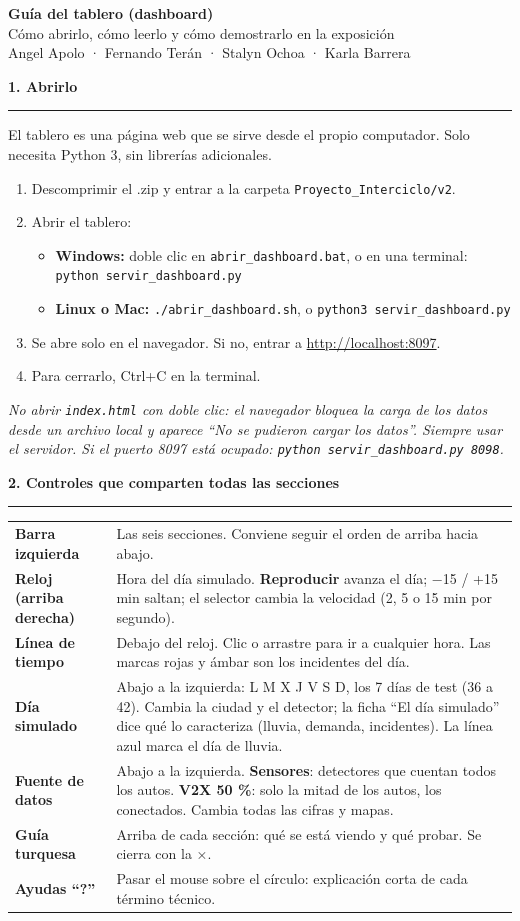 \documentclass[11pt,a4paper]{article}
\newcommand{\seccion}[1]{\bigskip\par{\Large\bfseries\color{verde}#1}\par\smallskip\hrule\smallskip}
\newcommand{\nota}[1]{{\small\color{gris}\itshape #1}\par}
\begin{document}
{\LARGE\bfseries\color{verde} Guía del tablero (dashboard)}\\[4pt]
{\large Cómo abrirlo, cómo leerlo y cómo demostrarlo en la exposición}\\[2pt]
{\color{gris}Angel Apolo · Fernando Terán · Stalyn Ochoa · Karla Barrera}

\seccion{1. Abrirlo}
El tablero es una página web que se sirve desde el propio computador. Solo necesita Python 3, sin librerías adicionales.

\begin{enumerate}[leftmargin=*]
\item Descomprimir el .zip y entrar a la carpeta \texttt{Proyecto\_Interciclo/v2}.
\item Abrir el tablero:
  \begin{itemize}
  \item \textbf{Windows:} doble clic en \texttt{abrir\_dashboard.bat}, o en una terminal: \texttt{python servir\_dashboard.py}
  \item \textbf{Linux o Mac:} \texttt{./abrir\_dashboard.sh}, o \texttt{python3 servir\_dashboard.py}
  \end{itemize}
\item Se abre solo en el navegador. Si no, entrar a \url{http://localhost:8097}.
\item Para cerrarlo, Ctrl+C en la terminal.
\end{enumerate}
\nota{No abrir \texttt{index.html} con doble clic: el navegador bloquea la carga de los datos desde un archivo local y aparece ``No se pudieron cargar los datos''. Siempre usar el servidor. Si el puerto 8097 está ocupado: \texttt{python servir\_dashboard.py 8098}.}

\seccion{2. Controles que comparten todas las secciones}
\begin{tabular}{@{}>{\bfseries}p{3.6cm}p{12.6cm}@{}}
Barra izquierda & Las seis secciones. Conviene seguir el orden de arriba hacia abajo. \\[3pt]
Reloj (arriba derecha) & Hora del día simulado. \textbf{Reproducir} avanza el día; −15 / +15 min saltan; el selector cambia la velocidad (2, 5 o 15 min por segundo). \\[3pt]
Línea de tiempo & Debajo del reloj. Clic o arrastre para ir a cualquier hora. Las marcas rojas y ámbar son los incidentes del día. \\[3pt]
Día simulado & Abajo a la izquierda: L M X J V S D, los 7 días de test (36 a 42). Cambia la ciudad y el detector; la ficha ``El día simulado'' dice qué lo caracteriza (lluvia, demanda, incidentes). La línea azul marca el día de lluvia. \\[3pt]
Fuente de datos & Abajo a la izquierda. \textbf{Sensores}: detectores que cuentan todos los autos. \textbf{V2X 50 \%}: solo la mitad de los autos, los conectados. Cambia todas las cifras y mapas. \\[3pt]
Guía turquesa & Arriba de cada sección: qué se está viendo y qué probar. Se cierra con la ×. \\[3pt]
Ayudas ``?'' & Pasar el mouse sobre el círculo: explicación corta de cada término técnico. \\
\end{tabular}
\end{document}
